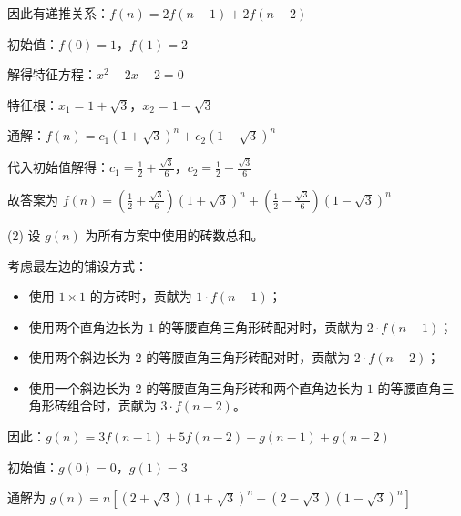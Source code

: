 \documentclass{article}
\begin{document}
因此有递推关系：$f(n)=2f(n-1)+2f(n-2)$

初始值：$f(0)=1$，$f(1)=2$

解得特征方程：$x^2-2x-2=0$

特征根：$x_1=1+\sqrt{3}$，$x_2=1-\sqrt{3}$

通解：$f(n)=c_1(1+\sqrt{3})^n+c_2(1-\sqrt{3})^n$

代入初始值解得：$c_1=\frac{1}{2}+\frac{\sqrt{3}}{6}$，$c_2=\frac{1}{2}-\frac{\sqrt{3}}{6}$

故答案为 $f(n)=(\frac{1}{2}+\frac{\sqrt{3}}{6})(1+\sqrt{3})^n+(\frac{1}{2}-\frac{\sqrt{3}}{6})(1-\sqrt{3})^n$

(2) 设 $g(n)$ 为所有方案中使用的砖数总和。

考虑最左边的铺设方式：
\begin{itemize}
\item 使用 $1 \times 1$ 的方砖时，贡献为 $1 \cdot f(n-1)$；
\item 使用两个直角边长为 $1$ 的等腰直角三角形砖配对时，贡献为 $2 \cdot f(n-1)$；
\item 使用两个斜边长为 $2$ 的等腰直角三角形砖配对时，贡献为 $2 \cdot f(n-2)$；
\item 使用一个斜边长为 $2$ 的等腰直角三角形砖和两个直角边长为 $1$ 的等腰直角三角形砖组合时，贡献为 $3 \cdot f(n-2)$。
\end{itemize}

因此：$g(n)=3f(n-1)+5f(n-2)+g(n-1)+g(n-2)$

初始值：$g(0)=0$，$g(1)=3$

通解为 $g(n)=n[(2+\sqrt{3})(1+\sqrt{3})^n+(2-\sqrt{3})(1-\sqrt{3})^n]$
\end{document}
